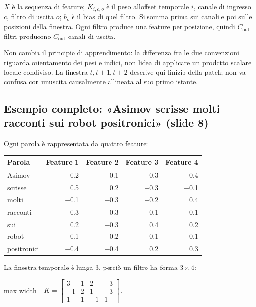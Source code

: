 \documentclass[11pt,a4paper,oneside,openany]{book}
\begin{document}
\(X\) è la sequenza di feature; \(K_{i,c,o}\) è il peso all\textquotesingle offset temporale \(i\), canale di ingresso \(c\), filtro di uscita \(o\); \(b_o\) è il bias di quel filtro. Si somma prima sui canali e poi sulle posizioni della finestra. Ogni filtro produce una feature per posizione, quindi \(C_{\mathrm{out}}\) filtri producono \(C_{\mathrm{out}}\) canali di uscita.

Non cambia il principio di apprendimento: la differenza fra le due convenzioni riguarda orientamento dei pesi e indici, non l\textquotesingle idea di applicare un prodotto scalare locale condiviso. La finestra \(t,t+1,t+2\) descrive qui l\textquotesingle inizio della patch; non va confusa con un\textquotesingle uscita causalmente allineata al suo primo istante.

\subsection{Esempio completo: «Asimov scrisse molti racconti sui robot positronici» (slide 8)}\label{f04-r78}

Ogni parola è rappresentata da quattro feature:

\begin{longtable}[]{@{}lrrrr@{}}
\toprule\noalign{}
Parola & Feature 1 & Feature 2 & Feature 3 & Feature 4 \\
\midrule\noalign{}
\endhead
\bottomrule\noalign{}
\endlastfoot
Asimov & 0.2 & 0.1 & −0.3 & 0.4 \\
scrisse & 0.5 & 0.2 & −0.3 & −0.1 \\
molti & −0.1 & −0.3 & −0.2 & 0.4 \\
racconti & 0.3 & −0.3 & 0.1 & 0.1 \\
sui & 0.2 & −0.3 & 0.4 & 0.2 \\
robot & 0.1 & 0.2 & −0.1 & −0.1 \\
positronici & −0.4 & −0.4 & 0.2 & 0.3 \\
\end{longtable}

La finestra temporale è lunga 3, perciò un filtro ha forma \(3\times4\):

\begin{center}
\begin{adjustbox}{max width=\linewidth}
$\displaystyle K=\begin{bmatrix}3&1&2&-3\\-1&2&1&-3\\1&1&-1&1\end{bmatrix}.$
\end{adjustbox}
\end{center}
\end{document}
